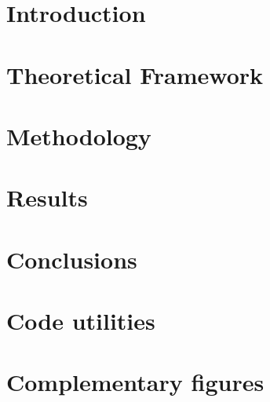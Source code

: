 \documentclass[12pt,letterpaper,oneside]{book}
\begin{document}
\newpage

\visibleintenttrue

\chapter{Introduction}

	
\chapter{Theoretical Framework}


\chapter{Methodology}


\chapter{Results}


\chapter{Conclusions}



\appendix
\appendixpage
\noappendicestocpagenum
\addappheadtotoc

\chapter{Code utilities}


\chapter{Complementary figures}





\end{document}
